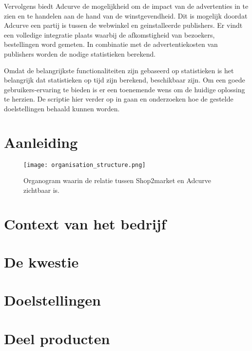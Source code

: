 Vervolgens biedt Adcurve de mogelijkheid om de impact van de advertenties in te zien en te handelen aan de hand van de winstgevendheid. Dit is mogelijk doordat Adcurve een partij is tussen de webwinkel en geinstalleerde publishers. Er vindt een volledige integratie plaats waarbij de afkomstigheid van bezoekers, bestellingen word gemeten. In combinatie met de advertentiekosten van publishers worden de nodige statistieken berekend.

Omdat de belangrijkste functionaliteiten zijn gebaseerd op statistieken is het belangrijk dat statistieken op tijd zijn berekend, beschikbaar zijn.
Om een goede gebruikers-ervaring te bieden is er een toenemende wens om de huidige oplossing te herzien. De scriptie hier verder op in gaan en onderzoeken hoe de gestelde doelstellingen behaald kunnen worden.


\section{Aanleiding} %

\begin{figure}[h]
    \texttt{[image: organisation\_structure.png]}
    \caption{Organogram waarin de relatie tussen Shop2market en Adcurve zichtbaar is.}
    \label{fig:orgchart}
\end{figure}

\section{Context van het bedrijf} %


\section{De kwestie} %

\section{Doelstellingen} %

\section{Deel producten}




